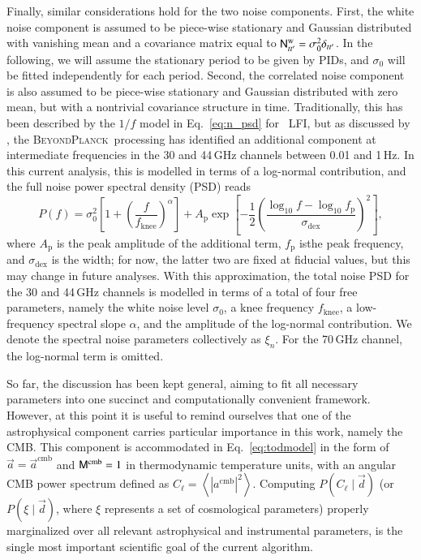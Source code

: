 \documentclass[twocolumn]{aa}
\renewcommand{\d}[0]{\vec{d}}
\renewcommand{\a}[0]{\vec{a}}
\newcommand{\N}[0]{\tens{N}}
\newcommand{\M}[0]{\tens{M}}
\newcommand{\BP}{\textsc{BeyondPlanck}}
\begin{document}
Finally, similar considerations hold for the two noise
components. First, the white noise component is assumed to be
piece-wise stationary and Gaussian distributed with vanishing mean and
a covariance matrix equal to $\N^{\mathrm{w}}_{tt'}=\sigma_0^2
\delta_{tt'}$. In the following, we will assume the stationary period
to be given by PIDs, and $\sigma_0$ will be fitted independently for
each period. Second, the correlated noise component is also assumed to
be piece-wise stationary and Gaussian distributed with zero mean, but
with a nontrivial covariance structure in time. Traditionally, this
has been described by the $1/f$ model in Eq.~\eqref{eq:n_psd} for
\Planck\ LFI, but as discussed by \citet{bp06}, the \BP\ processing
has identified an additional component at intermediate frequencies in
the 30 and 44\,GHz channels between 0.01 and 1\,Hz. In this current
analysis, this is modelled in terms of a log-normal contribution, and the full noise power spectral density (PSD) reads
\begin{equation}
        P(f) = \sigma_0^2\left[1 +
          \left(\frac{f}{f_\mathrm{knee}}\right)^\alpha\right] +
        A_\mathrm{p} \exp\left[-\frac{1}{2}\left(\frac{\log_{10}f -
            \log_{10}
            f_\mathrm{p}}{\sigma_\mathrm{dex}}\right)^2\right],
        \label{eq:1fmodel_lognorm}
\end{equation} 
where $A_\mathrm{p}$ is the peak amplitude of the additional term,
$f_\mathrm{p}$ isthe peak frequency, and $\sigma_\mathrm{dex}$ is the
width; for now, the latter two are fixed at fiducial values, but this
may change in future analyses.  With this approximation, the total
noise PSD for the 30 and 44\,GHz channels is modelled in terms of a
total of four free parameters, namely the white noise level
$\sigma_0$, a knee frequency $f_{\mathrm{knee}}$, a low-frequency
spectral slope $\alpha$, and the amplitude of the log-normal
contribution. We denote the spectral noise parameters collectively as
$\xi_n$. For the 70\,GHz channel, the log-normal term is omitted.

So far, the discussion has been kept general, aiming to fit all
necessary parameters into one succinct and computationally convenient
framework. However, at this point it is useful to remind ourselves
that one of the astrophysical component carries particular importance
in this work, namely the CMB. This component is accommodated in
Eq.~\eqref{eq:todmodel} in the form of $\a = \a^{\mathrm{cmb}}$ and
$\M^{\mathrm{cmb}} = 1$ in thermodynamic temperature units, with an
angular CMB power spectrum defined as $C_{\ell} = \left<
|a^{\mathrm{cmb}}|^2\right>$. Computing $P(C_{\ell}\mid \d)$ (or
$P(\xi\mid \d)$, where $\xi$ represents a set of cosmological parameters)
properly marginalized over all relevant astrophysical and instrumental
parameters, is the single most important scientific goal of the
current algorithm.
\end{document}
